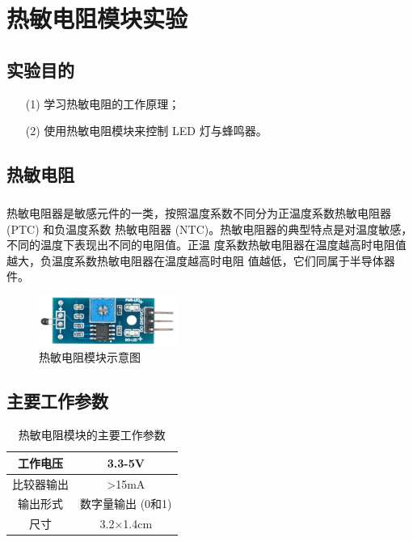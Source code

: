 \documentclass[UTF8, oneside]{ctexbook}
\begin{document}
\chapter{热敏电阻模块实验}
\section{实验目的}
\begin{itemize}
    \item[(1)] 学习热敏电阻的工作原理；
    \item[(2)] 使用热敏电阻模块来控制 LED 灯与蜂鸣器。
\end{itemize}

\section{热敏电阻}
\paragraph{}
热敏电阻器是敏感元件的一类，按照温度系数不同分为正温度系数热敏电阻器 (PTC) 和负温度系数
热敏电阻器 (NTC)。热敏电阻器的典型特点是对温度敏感，不同的温度下表现出不同的电阻值。正温
度系数热敏电阻器在温度越高时电阻值越大，负温度系数热敏电阻器在温度越高时电阻
值越低，它们同属于半导体器件。

\begin{figure}[h]
    \centering
    \includegraphics[width=0.4\textwidth]{./result/sensor/14/sensor.png}
    \caption{热敏电阻模块示意图}
    \label{14_sensor}
\end{figure}

\section{主要工作参数}
\begin{table}[h]
    \centering
    \begin{tabular}{|c|c|}
    \hline
    工作电压 & 3.3-5V           \\ \hline
    比较器输出 & >15mA \\ \hline
    输出形式 & 数字量输出 (0和1) \\ \hline
    尺寸   & 3.2$\times$1.4cm \\ \hline
    \end{tabular}
    \caption{热敏电阻模块的主要工作参数}
\end{table}
\end{document}
